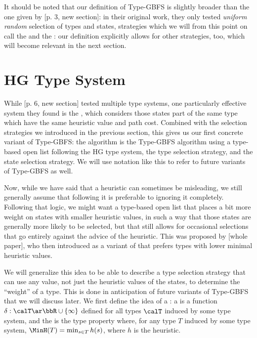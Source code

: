 
It should be noted that our definition of Type-GBFS is slightly broader than the one given by [p. 3, new section]: in their original work, they only tested \emph{uniform random} selection of types and states, strategies which we will from this point on call the  and the : our definition explicitly allows for other strategies, too, which will become relevant in the next section.

\section{HG Type System}
\label{sec:hg}

While [p. 6, new section] tested multiple type systems, one particularly effective system they found is the , which considers those states part of the same type which have the same heuristic value and path cost. Combined with the selection strategies we introduced in the previous section, this gives us our first concrete variant of Type-GBFS: the \kw{\hgUu} algorithm is the Type-GBFS algorithm using a type-based open list following the HG type system, the \Utss type selection strategy, and the \Usss state selection strategy. We will use notation like this to refer to future variants of Type-GBFS as well.

Now, while we have said that a heuristic can sometimes be misleading, we still generally assume that following it is preferable to ignoring it completely. Following that logic, we might want a type-based open list that places a bit more weight on states with smaller heuristic values, in such a way that those states are generally more likely to be selected, but that still allows for occasional selections that go entirely against the advice of the heuristic. This was proposed by [whole paper], who then introduced  as a variant of \hgUu that prefers types with lower minimal heuristic values.

We will generalize this idea to be able to describe a type selection strategy that can use any value, not just the heuristic values of the states, to determine the ``weight'' of a type. This is done in anticipation of future variants of Type-GBFS that we will discuss later. We first define the idea of a : a  is a function $\delta:\calT\ar\bbR\cup\{\infty\}$ defined for all types $\calT$ induced by some type system, and the  is the type property where, for any type $T$ induced by some type system, $\MinH(T)=\min_{s\in T}h(s)$, where $h$ is the heuristic.


